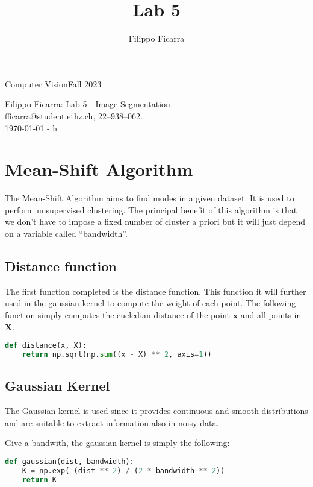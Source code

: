 \documentclass{ETHExercise}
\title{Lab 5}
\author{Filippo Ficarra}
\newcommand{\timestamp}{\ddmmyyyydate\today \,\,- \currenttime h}
\begin{document}
{}
{\Large Computer Vision}{Fall 2023}
\begin{center}
    {\Huge Filippo Ficarra: Lab 5 - Image Segmentation}\\
      \quad\newline
      fficarra@student.ethz.ch, 22--938--062.\\
      \quad\newline
      \timestamp
      \end{center}

\section{Mean-Shift Algorithm}

The Mean-Shift Algorithm aims to find modes in a given dataset. It is used 
to perform unsupervised clustering. The principal benefit of 
this algorithm is that we don't have to impose a fixed number of cluster a priori
but it will just depend on a variable called ``bandwidth''.


\subsection{Distance function}

The first function completed is the distance function. This function it will 
further used in the gaussian kernel to compute the weight of each point.
The following function simply computes the eucledian distance of the point $\bm{x}$ and all
points in $\bm{X}$.

\begin{lstlisting}[language=Python, caption=Distance function]
  def distance(x, X):
    return np.sqrt(np.sum((x - X) ** 2, axis=1))
\end{lstlisting}

\subsection{Gaussian Kernel}
The Gaussian kernel is used since it provides continuous and smooth distributions
and are suitable to extract information also in noisy data.

Give a bandwith, the gaussian kernel is simply the following:
\begin{lstlisting}[language=Python, caption=Gaussian Kernel]
  def gaussian(dist, bandwidth):
    K = np.exp(-(dist ** 2) / (2 * bandwidth ** 2))
    return K
\end{lstlisting}
\end{document}
